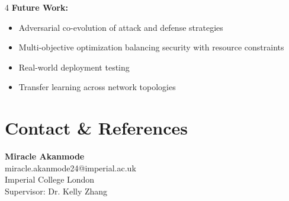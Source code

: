 \documentclass[a0,landscape]{ImperialPoster}
\begin{document}
\begin{multicols}{4}
\textbf{Future Work:}
\begin{itemize}
\item Adversarial co-evolution of attack and defense strategies
\item Multi-objective optimization balancing security with resource constraints
\item Real-world deployment testing
\item Transfer learning across network topologies
\end{itemize}

\vspace{1cm}

\section{Contact \& References}

\textbf{Miracle Akanmode}\\
miracle.akanmode24@imperial.ac.uk\\
Imperial College London\\
Supervisor: Dr. Kelly Zhang

\end{multicols}
\end{document}
